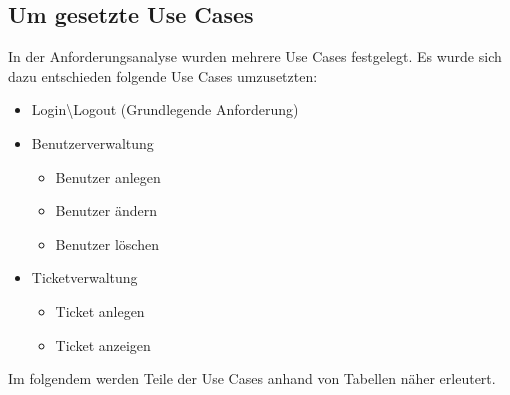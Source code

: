 \documentclass[12pt, a4paper]{article}
\begin{document}
\subsection{Um gesetzte Use Cases}
In der Anforderungsanalyse wurden mehrere Use Cases festgelegt. Es wurde sich dazu entschieden folgende Use Cases umzusetzten:
\begin{itemize}
\item Login\textbackslash Logout (Grundlegende Anforderung)
\item Benutzerverwaltung
\begin{itemize}
\item Benutzer anlegen
\item Benutzer ändern
\item Benutzer löschen

\end{itemize}
\item Ticketverwaltung
\begin{itemize}
\item Ticket anlegen
\item Ticket anzeigen
\end{itemize}


\end{itemize}

Im folgendem werden Teile der Use Cases anhand von Tabellen näher erleutert.
\end{document}
